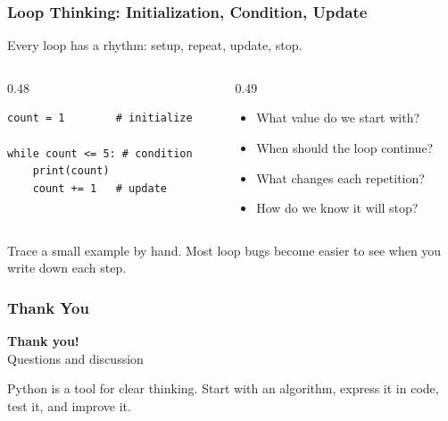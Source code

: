 \documentclass[aspectratio=169,10pt]{beamer}
\newcommand{\myitem}[1]{\item #1\vspace{0.04cm}}
\begin{document}
\begin{frame}[fragile]
\frametitle{Loop Thinking: Initialization, Condition, Update}
\begin{tcolorbox}[lecturebox,title=Key idea]
Every loop has a rhythm: setup, repeat, update, stop.
\end{tcolorbox}

\begin{columns}[T,totalwidth=\textwidth]
\begin{column}{0.48\textwidth}
\begin{lstlisting}[style=pycode]
count = 1        # initialize

while count <= 5: # condition
    print(count)
    count += 1   # update
\end{lstlisting}
\end{column}
\begin{column}{0.49\textwidth}
\begin{itemize}\setlength\itemsep{0.04cm}
  \myitem{What value do we start with?}
  \myitem{When should the loop continue?}
  \myitem{What changes each repetition?}
  \myitem{How do we know it will stop?}
\end{itemize}
\end{column}
\end{columns}

\begin{tcolorbox}[lecturebox,title=Beginner habit]
Trace a small example by hand. Most loop bugs become easier to see when you write down each step.
\end{tcolorbox}
\end{frame}



\begin{frame}
\frametitle{Thank You}
\vspace{0.9cm}
\begin{center}
{\fontsize{34}{40}\selectfont \textbf{Thank you!}}\\[0.45cm]
{\fontsize{18}{22}\selectfont Questions and discussion}
\end{center}
\vspace{0.5cm}
\begin{tcolorbox}[lecturebox,title=Course takeaway]
Python is a tool for clear thinking. Start with an algorithm, express it in code, test it, and improve it.
\end{tcolorbox}
\end{frame}
\end{document}
